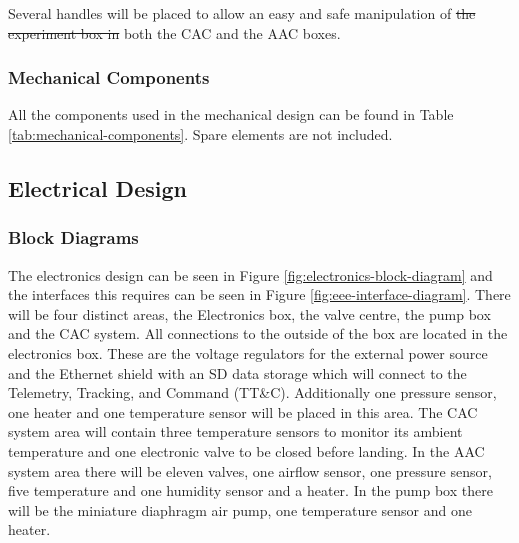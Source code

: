 \documentclass[a4paper,12pt,twoside]{article}
\providecommand{\DIFdeltex}[1]{{\protect\color{red}\sout{#1}}}                      %
\providecommand{\DIFdelbegin}{} %
\providecommand{\DIFdelend}{} %
\providecommand{\DIFdel}[1]{\texorpdfstring{\DIFdeltex{#1}}{}} %
\newcommand{\DIFscaledelfig}{0.5}
\newlength{\DIFdelgraphicswidth} %
\newlength{\DIFdelgraphicsheight} %
\newcommand{\DIFdelincludegraphics}[2][]{%
\sbox{\DIFdelgraphicsbox}{\DIFOincludegraphics[#1]{#2}}%
\settoboxwidth{\DIFdelgraphicswidth}{\DIFdelgraphicsbox} %
\settoboxtotalheight{\DIFdelgraphicsheight}{\DIFdelgraphicsbox} %
\scalebox{\DIFscaledelfig}{%
\parbox[b]{\DIFdelgraphicswidth}{\usebox{\DIFdelgraphicsbox}\\[-\baselineskip] \rule{\DIFdelgraphicswidth}{0em}}\llap{\resizebox{\DIFdelgraphicswidth}{\DIFdelgraphicsheight}{%
\setlength{\unitlength}{\DIFdelgraphicswidth}%
\begin{picture}(1,1)%
\thicklines\linethickness{2pt} %
{\color[rgb]{1,0,0}\put(0,0){\framebox(1,1){}}}%
{\color[rgb]{1,0,0}\put(0,0){\line( 1,1){1}}}%
{\color[rgb]{1,0,0}\put(0,1){\line(1,-1){1}}}%
\end{picture}%
}\hspace*{3pt}}} %
} %
\DeclareRobustCommand{\DIFdelbegin}{\DIFOdelbegin \let\includegraphics\DIFdelincludegraphics} %
\DeclareRobustCommand{\DIFdelend}{\DIFOaddend \let\includegraphics\DIFOincludegraphics} %
\begin{document}
Several handles will be placed to allow an easy and safe manipulation of \DIFdelbegin \DIFdel{the experiment box in }\DIFdelend both the CAC and the AAC boxes. 


\subsubsection{Mechanical Components}

All the components used in the mechanical design can be found in Table \ref{tab:mechanical-components}. Spare elements are not included. 


\raggedbottom
\pagebreak
\subsection{Electrical Design}

\subsubsection{Block Diagrams}
\begin{centering}
The electronics design can be seen in Figure \ref{fig:electronics-block-diagram} and the interfaces this requires can be seen in Figure \ref{fig:eee-interface-diagram}. There will be four distinct areas, the Electronics box, the valve centre, the pump box and the CAC system. All connections to the outside of the box are located in the electronics box. These are the voltage regulators for the external power source and the Ethernet shield with an SD data storage which will connect to the Telemetry, Tracking, and Command (TT\&C). Additionally one pressure sensor, one heater and one temperature sensor will be placed in this area. The CAC system area will contain three temperature sensors to monitor its ambient temperature and one electronic valve to be closed before landing. In the AAC system area there will be eleven valves, one airflow sensor, one pressure sensor, five temperature and one humidity sensor and a heater. In the pump box there will be the miniature diaphragm air pump, one temperature sensor and one heater.
\end{centering}
\bigskip
\end{document}

